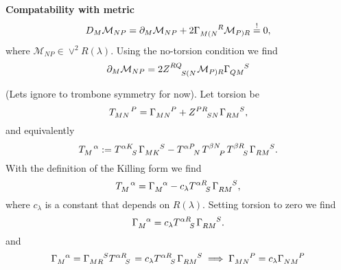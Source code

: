 \documentclass{article}
\begin{document}
\textbf{Compatability with metric}
\begin{equation}
    D_M\mathcal{M}_{NP} = \pd_M\mathcal{M}_{NP}+2\tensor{\Gamma}{_{M(N}^R}\mathcal{M}_{P)R}\overset{!}{=} 0,
\end{equation}
where $\mathcal{M}_{NP}\in \vee^2R(\lambda)$. Using the no-torsion condition we find 
\begin{equation}
    \pd_M\mathcal{M}_{NP} = 2\tensor{Z}{^{RQ}_{S(N}}\mathcal{M}_{P)R}\tensor{\Gamma}{_{QM}^S}
\end{equation}


\newpage

(Lets ignore to trombone symmetry for now). Let torsion be 
\begin{equation}
    \tensor{T}{_{MN}^P} = \tensor{\Gamma}{_{MN}^P}+\tensor{Z}{^{PR}_{SN}}\tensor{\Gamma}{_{RM}^S},
\end{equation}
and equivalently 
\begin{equation}
    \tensor{T}{_M^\alpha}:= \tensor{T}{^\alpha^K_S}\tensor{\Gamma}{_M_K^S}-\tensor{T}{^\alpha^P_N}\tensor{T}{^\beta^N_P}\tensor{T}{^\beta^R_S}\tensor{\Gamma}{_{RM}^S}.
\end{equation}
With the definition of the Killing form we find 
\begin{equation}
    \tensor{T}{_M^\alpha} = \tensor{\Gamma}{_M^\alpha}-c_\lambda \tensor{T}{^\alpha ^R_S}\tensor{\Gamma}{_R_M^S},
\end{equation}
where $c_\lambda$ is a constant that depends on $R(\lambda)$. Setting torsion to zero we find 
\begin{equation}
    \tensor{\Gamma}{_M^\alpha} = c_\lambda \tensor{T}{^\alpha ^R_S}\tensor{\Gamma}{_R_M^S}.
\end{equation}
and 
\begin{equation}
    \tensor{\Gamma}{_M^\alpha} = \tensor{\Gamma}{_M_R^S}\tensor{T}{^\alpha^R_S} = c_\lambda \tensor{T}{^\alpha^R_S}\tensor{\Gamma}{_R_M^S}\implies \tensor{\Gamma}{_M_N^P}= c_\lambda \tensor{\Gamma}{_N_M^P}
\end{equation}
\end{document}
